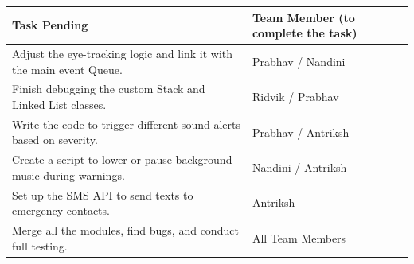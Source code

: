 \documentclass[12pt,a4paper]{article}
\renewcommand{\arraystretch}{1.4}
\renewcommand{\headrulewidth}{0pt}
\renewcommand{\footrulewidth}{0pt}
\newcommand{\sectiontitle}[1]{%
    {\color{GEUBlue}\fontsize{18}{22}\selectfont #1}%
}
\begin{document}
\noindent
\begin{tabularx}{\textwidth}{
    |>{\raggedright\arraybackslash}p{}
    |>{\raggedright\arraybackslash}X|
}
\hline
\textbf{Task Pending} &
\textbf{Team Member (to complete the task)}
\\
\hline
Adjust the eye-tracking logic and link it with the main event Queue.
& Prabhav / Nandini
\\
\hline
Finish debugging the custom Stack and Linked List classes.
& Ridvik / Prabhav
\\
\hline
Write the code to trigger different sound alerts based on severity.
& Prabhav / Antriksh
\\
\hline
Create a script to lower or pause background music during warnings.
& Nandini / Antriksh
\\
\hline
Set up the SMS API to send texts to emergency contacts.
& Antriksh
\\
\hline
Merge all the modules, find bugs, and conduct full testing.
& All Team Members
\\
\hline
\end{tabularx}

\vspace{0.35cm}
\newpage



\setlength{\parindent}{0pt}
\setlength{\parskip}{0pt}
\renewcommand{\arraystretch}{1.4}
\setlength{\emergencystretch}{2em}
\raggedbottom

\pagestyle{fancy}
\fancyhf{}
\renewcommand{\headrulewidth}{0pt}
\renewcommand{\footrulewidth}{0pt}
\setlength{\headheight}{20pt}
\setlength{\headsep}{0.65cm}
\setlength{\footskip}{0.65cm}


\newcommand{\sectiontitle}[1]{{\color{GEUBlue}\fontsize{18}{22}\selectfont #1}}
\newcommand{\instruction}[1]{{\color{InstructionGrey}\fontsize{10.5}{13}\selectfont #1}}
\end{document}
